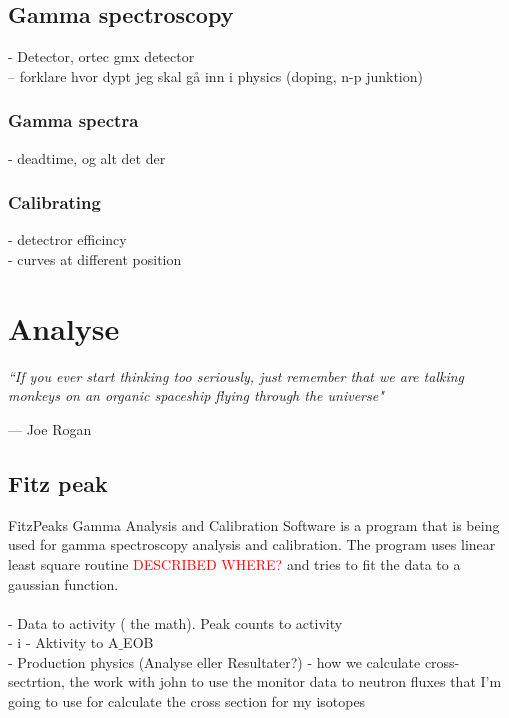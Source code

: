 \documentclass[twoside,english]{uiofysmaster/uiofysmaster}
\begin{document}
\section{Gamma spectroscopy}
\label{sec: gamma_spectro}

- Detector, ortec gmx detector\\
-- forklare hvor dypt jeg skal gå inn i physics (doping, n-p junktion)\\


\subsection{Gamma spectra}
\label{sec: gamma_spectra}

- deadtime, og alt det der

\subsection{Calibrating}
\label{sec: calibrating}

- detectror efficincy\\
- curves at different position


\chapter{Analyse}
\label{ch:analyse}

\epigraph{\itshape ``If you ever start thinking too seriously, just remember that we are talking monkeys on an organic spaceship flying through the universe"}{--- \textup{Joe Rogan}}



\section{Fitz peak}
\label{sec:fitz_peak}

FitzPeaks Gamma Analysis and Calibration Software is a program that  is being used for gamma spectroscopy analysis and calibration. The program uses linear least square routine \textcolor{red}{DESCRIBED WHERE?} and tries to fit the data to a gaussian function. 
\\
 \\
- Data to activity ( the math). Peak counts to activity\\
- i - Aktivity to A$\_$EOB\\
- Production physics (Analyse eller Resultater?) - how we calculate cross-sectrtion, the work with john to use the monitor data to neutron fluxes that I’m going to use for calculate the cross section for my isotopes
\end{document}
